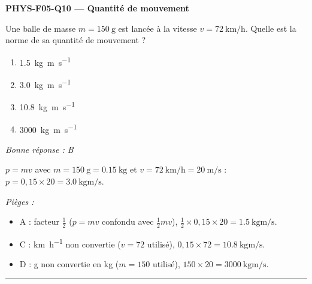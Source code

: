 \documentclass[11pt,a4paper]{article}
\begin{document}
\noindent\textbf{PHYS-F05-Q10 --- Quantité de mouvement}\par
Une balle de masse $m=\qty{150}{\gram}$ est lancée à la vitesse $v=\qty{72}{\kilo\metre\per\hour}$.
Quelle est la norme de sa quantité de mouvement ?
\begin{enumerate}[label=\Alph*)]
\item \qty{1.5}{\kilogram\metre\per\second}
\item \qty{3.0}{\kilogram\metre\per\second}
\item \qty{10.8}{\kilogram\metre\per\second}
\item \qty{3000}{\kilogram\metre\per\second}
\end{enumerate}
\textit{Bonne réponse : B}\par
$p=mv$ avec $m=\qty{150}{\gram}=\qty{0.15}{\kilogram}$ et
$v=\qty{72}{\kilo\metre\per\hour}=\qty{20}{\metre\per\second}$ :
$p=0{,}15\times20=\qty{3.0}{\kilogram\metre\per\second}$.\par
\textit{Pièges :}
\begin{itemize}
\item A : facteur $\tfrac12$ ($p=mv$ confondu avec $\tfrac12 mv$), $\tfrac12\times0{,}15\times20=\qty{1.5}{\kilogram\metre\per\second}$.
\item C : \si{\kilo\metre\per\hour} non convertie ($v=72$ utilisé), $0{,}15\times72=\qty{10.8}{\kilogram\metre\per\second}$.
\item D : \si{\gram} non convertie en \si{\kilogram} ($m=150$ utilisé), $150\times20=\qty{3000}{\kilogram\metre\per\second}$.
\end{itemize}
\vspace{8pt}\hrule\vspace{8pt}
\end{document}
